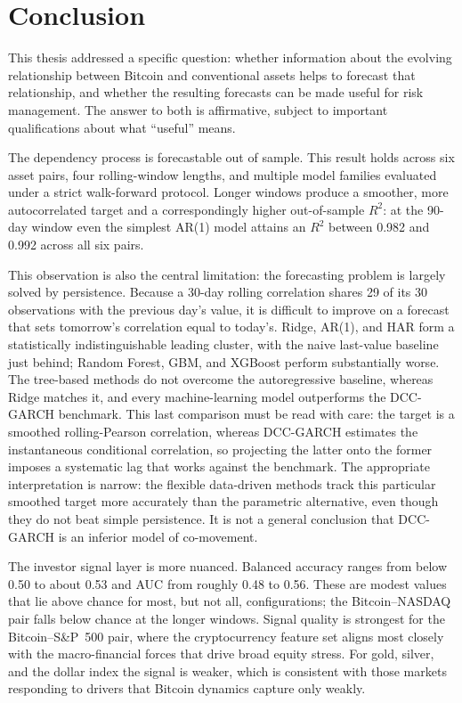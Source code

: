 \section{Conclusion}

This thesis addressed a specific question: whether information about the evolving relationship between Bitcoin and conventional assets helps to forecast that relationship, and whether the resulting forecasts can be made useful for risk management. The answer to both is affirmative, subject to important qualifications about what ``useful'' means.

The dependency process is forecastable out of sample. This result holds across six asset pairs, four rolling-window lengths, and multiple model families evaluated under a strict walk-forward protocol. Longer windows produce a smoother, more autocorrelated target and a correspondingly higher out-of-sample $R^2$: at the 90-day window even the simplest AR(1) model attains an $R^2$ between 0.982 and 0.992 across all six pairs.

This observation is also the central limitation: the forecasting problem is largely solved by persistence. Because a 30-day rolling correlation shares 29 of its 30 observations with the previous day's value, it is difficult to improve on a forecast that sets tomorrow's correlation equal to today's. Ridge, AR(1), and HAR form a statistically indistinguishable leading cluster, with the naive last-value baseline just behind; Random Forest, GBM, and XGBoost perform substantially worse. The tree-based methods do not overcome the autoregressive baseline, whereas Ridge matches it, and every machine-learning model outperforms the DCC-GARCH benchmark. This last comparison must be read with care: the target is a smoothed rolling-Pearson correlation, whereas DCC-GARCH estimates the instantaneous conditional correlation, so projecting the latter onto the former imposes a systematic lag that works against the benchmark. The appropriate interpretation is narrow: the flexible data-driven methods track this particular smoothed target more accurately than the parametric alternative, even though they do not beat simple persistence. It is not a general conclusion that DCC-GARCH is an inferior model of co-movement.

The investor signal layer is more nuanced. Balanced accuracy ranges from below 0.50 to about 0.53 and AUC from roughly 0.48 to 0.56. These are modest values that lie above chance for most, but not all, configurations; the Bitcoin--NASDAQ pair falls below chance at the longer windows. Signal quality is strongest for the Bitcoin--S\&P~500 pair, where the cryptocurrency feature set aligns most closely with the macro-financial forces that drive broad equity stress. For gold, silver, and the dollar index the signal is weaker, which is consistent with those markets responding to drivers that Bitcoin dynamics capture only weakly.

